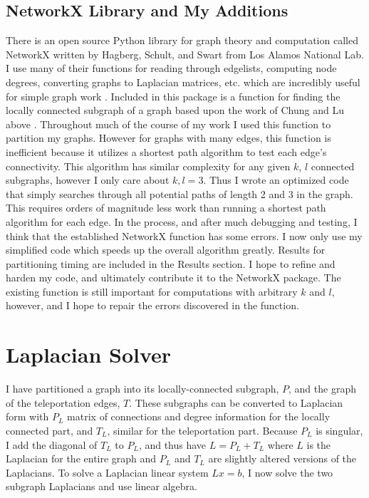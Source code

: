 \documentclass{article}
\begin{document}
\subsection{NetworkX Library and My Additions}
There is an open source Python library for graph theory and computation called NetworkX written by Hagberg, Schult, and Swart from Los Alamos National Lab. I use many of their functions for reading through edgelists, computing node degrees, converting graphs to Laplacian matrices, etc. which are incredibly useful for simple graph work \cite{Hagberg:2008}. Included in this package is a function for finding the locally connected subgraph of a graph based upon the work of Chung and Lu above \cite{Chung:2004}. Throughout much of the course of my work I used this function to partition my graphs. However for graphs with many edges, this function is inefficient because it utilizes a shortest path algorithm \cite{Dijkstra:1959} to test each edge's connectivity. This algorithm has similar complexity for any given $k$, $l$ connected subgraphs, however I only care about $k,l = 3$. Thus I wrote an optimized code that simply searches through all potential paths of length 2 and 3 in the graph. This requires orders of magnitude less work than running a shortest path algorithm for each edge. In the process, and after much debugging and testing, I think that the established NetworkX function has some errors. I now only use my simplified code which speeds up the overall algorithm greatly. Results for partitioning timing are included in the Results section. I hope to refine and harden my code, and ultimately contribute it to the NetworkX package. The existing function is still important for computations with arbitrary $k$ and $l$, however, and I hope to repair the errors discovered in the function.

\section{Laplacian Solver}
I have partitioned a graph into its locally-connected subgraph, $P$, and the graph of the teleportation edges, $T$. These subgraphs can be converted to Laplacian form with $P_L$ matrix of connections and degree information for the locally connected part, and $T_L$, similar for the teleportation part. Because $P_L$ is singular, I add the diagonal of $T_L$ to $P_L$, and thus have $L = P_L + T_L$ where $L$ is the Laplacian for the entire graph and $P_L$ and $T_L$ are slightly altered versions of the Laplacians. To solve a Laplacian linear system $Lx=b$, I now solve the two subgraph Laplacians and use linear algebra.
\end{document}
